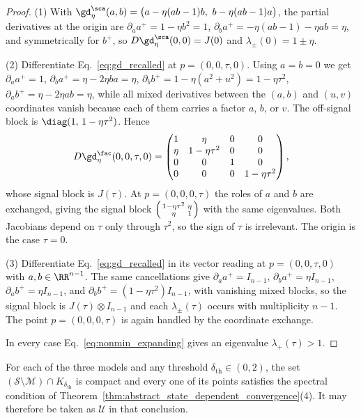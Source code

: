 \documentclass{article}
\begin{document}
\begin{proof}
(1) With $\gd_\eta^\sca(a,b)=\bigl(a-\eta(ab-1)b,\ b-\eta(ab-1)a\bigr)$, the
partial derivatives at the origin are $\partial_a a^+=1-\eta b^2=1$,
$\partial_b a^+=-\eta(ab-1)-\eta ab=\eta$, and symmetrically for $b^+$, so
$D\gd_\eta^\sca(0,0)=J(0)$ and $\lambda_\pm(0)=1\pm\eta$.

(2) Differentiate Eq.~\eqref{eq:gd_recalled} at
$p=(0,0,\tau,0)$. Using $a=b=0$ we get $\partial_a a^+=1$,
$\partial_b a^+=\eta-2\eta ba=\eta$, $\partial_b b^+=1-\eta(a^2+u^2)=1-\eta\tau^2$,
$\partial_a b^+=\eta-2\eta ab=\eta$, while all mixed derivatives between the
$(a,b)$ and $(u,v)$ coordinates vanish because each of them carries a factor
$a$, $b$, or $v$. The off-signal block is $\diag(1,\,1-\eta\tau^2)$. Hence
\begin{align}
    D\gd_\eta^\fac(0,0,\tau,0)
    =
    \begin{pmatrix}
        1 & \eta & 0 & 0\\
        \eta & 1-\eta\tau^2 & 0 & 0\\
        0 & 0 & 1 & 0\\
        0 & 0 & 0 & 1-\eta\tau^2
    \end{pmatrix},
    \label{eq:jacobian_nonmin_u_axis}
\end{align}
whose signal block is $J(\tau)$. At $p=(0,0,0,\tau)$ the roles of $a$ and $b$
are exchanged, giving the signal block
$\begin{psmallmatrix}1-\eta\tau^2&\eta\\ \eta&1\end{psmallmatrix}$ with the
same eigenvalues. Both Jacobians depend on $\tau$ only through $\tau^2$, so the
sign of $\tau$ is irrelevant. The origin is the case $\tau=0$.

(3) Differentiate Eq.~\eqref{eq:gd_recalled} in its vector reading at
$p=(0,0,\tau,0)$ with $a,b\in\RR^{n-1}$. The same cancellations give
$\partial_a a^+=I_{n-1}$, $\partial_b a^+=\eta I_{n-1}$,
$\partial_a b^+=\eta I_{n-1}$, and
$\partial_b b^+=(1-\eta\tau^2)I_{n-1}$, with vanishing mixed blocks, so the
signal block is $J(\tau)\otimes I_{n-1}$ and each $\lambda_\pm(\tau)$ occurs
with multiplicity $n-1$. The point $p=(0,0,0,\tau)$ is again handled by the
coordinate exchange.

In every case Eq.~\eqref{eq:nonmin_expanding} gives an eigenvalue
$\lambda_+(\tau)>1$.
\end{proof}

\begin{corollary}\label{cor:nonmin_compact_unstable}
For each of the three models and any threshold
$\delta_{\mathrm{th}}\in(0,2)$, the set
$(\mathcal S\setminus\mathcal M)\cap K_{\delta_{\mathrm{th}}}$ is compact and
every one of its points satisfies the spectral condition of
Theorem~\ref{thm:abstract_state_dependent_convergence}(4). It may therefore be
taken as $\mathcal U$ in that conclusion.
\end{corollary}
\end{document}
